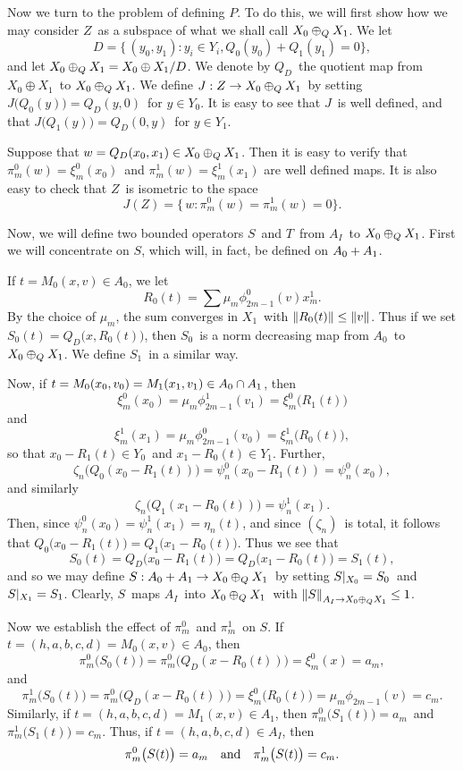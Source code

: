 Now we turn to the problem of defining $P$. To do this, we will first show how
we may consider $Z$\ as a subspace of what we shall call
$X_0\oplus_Q X_1$. We let 
$$ D = \{\, (y_0,y_1) : y_i \in Y_i, Q_0(y_0) + Q_1(y_1) = 0 \} ,$$  
and let $X_0\oplus_Q X_1 = X_0\oplus X_1 / D$.
We denote by $Q_D$\ the quotient map from $X_0\oplus X_1$\ to $X_0\oplus_Q X_1$.
We define $J:Z\to X_0\oplus_Q X_1$\ by setting $J\bigl(Q_0(y)\bigr)=Q_D(y,0)$\ for $y\in
Y_0$. It is easy to see that $J$\ is well defined, and
that $J\bigl(Q_1(y)\bigr)=Q_D(0,y)$\ for $y\in Y_1$.

Suppose that $w=Q_D(x_0,x_1) \in X_0\oplus_Q X_1$. Then it is easy to verify
that $\pi_m^0(w) = \xi_m^0(x_0)$\ and $\pi_m^1(w) = \xi_m^1(x_1)$ are
well defined maps. It is also easy to check that $Z$\ is isometric to
the space
$$ J(Z) = \{\,w: \pi_m^0(w) = \pi_m^1(w) =0 \} .$$

Now, we will define two bounded operators $S$\ and $T$\ from $A_I$\ to $X_0\oplus_Q X_1$.
First we will concentrate on $S$, which will, in fact, be defined on $A_0 + A_1$.

If $t = M_0(x,v) \in A_0$, we let 
$$ R_0(t) = \sum \mu_m \phi_{2m-1}^0(v) x_m^1 .$$
By the choice of $\mu_m$, the sum converges in $X_1$\ with $\left\| R_0(t) \right\| \le
\left\| v \right\|$. Thus if we set $S_0(t) = Q_D\bigl(x,R_0(t)\bigr)$, then $S_0$\ is
a norm decreasing map from $A_0$\ to $X_0\oplus_Q X_1$. We define $S_1$\ in a similar way.

Now, if $ t = M_0(x_0,v_0) = M_1(x_1,v_1) \in A_0 \cap A_1 $,
then
$$ \xi_m^0(x_0) = \mu_m \phi_{2m-1}^1(v_1) = \xi_m^0\bigl(R_1(t)\bigr) $$
and
$$ \xi_m^1(x_1) = \mu_m \phi_{2m-1}^0(v_0) = \xi_m^1\bigl(R_0(t)\bigr) ,$$
so that $x_0-R_1(t) \in Y_0$\ and $x_1-R_0(t) \in Y_1$. Further,
$$ \zeta_n\bigl(Q_0(x_0-R_1(t))\bigr) = \psi_n^0(x_0-R_1(t)) = \psi_n^0(x_0),$$
and similarly
$$ \zeta_n\bigl(Q_1(x_1-R_0(t))\bigr) = \psi_n^1(x_1) .$$
Then, since $\psi_n^0(x_0) = \psi_n^1(x_1) = \eta_n(t)$, and since
$(\zeta_n)$\ is total, it follows that $Q_0\bigl(x_0-R_1(t)\bigr) =
Q_1\bigl(x_1-R_0(t)\bigr) $. Thus we see that
$$ S_0(t) = Q_D\bigl(x_0-R_1(t)\bigr) = Q_D\bigl(x_1-R_0(t)\bigr) = S_1(t) ,$$
and so we may define $S:A_0 + A_1 \to X_0\oplus_Q X_1$\ by setting $S{\vert_{X_0}} = S_0$\
and $S{\vert_{X_1}} = S_1$. Clearly, $S$\ maps $A_I$\
into $X_0\oplus_Q X_1$\ with $\left\| S \right\|_{A_I\to X_0\oplus_Q X_1} \le 1$.

Now we establish the effect of $\pi_m^0$\ and $\pi_m^1$\ on $S$. If
$t=(h,a,b,c,d) = M_0(x,v) \in A_0$, then
$$ \pi^0_m\bigl(S_0(t)\bigr)
   = \pi_m^0 \bigl(Q_D(x-R_0(t))\bigr)
   = \xi_m^0(x)
   = a_m ,$$
and
$$ \pi^1_m\bigl(S_0(t)\bigr)
   = \pi_m^0 \bigl(Q_D(x-R_0(t))\bigr)
   = \xi_m^0\bigl(R_0(t)\bigr)
   = \mu_m \phi_{2m-1} (v) = c_m .$$
Similarly, if $t=(h,a,b,c,d) = M_1(x,v) \in A_1$, then
$\pi^0_m\bigl(S_1(t)\bigr) = a_m$\ and $\pi^1_m\bigl(S_1(t)\bigr) =
c_m$. Thus, if $t=(h,a,b,c,d) \in A_I$, then
$$ \pi^0_m\bigl(S(t)\bigr) = a_m
   \quad\hbox{and}\quad
   \pi^1_m\bigl(S(t)\bigr) = c_m .$$

